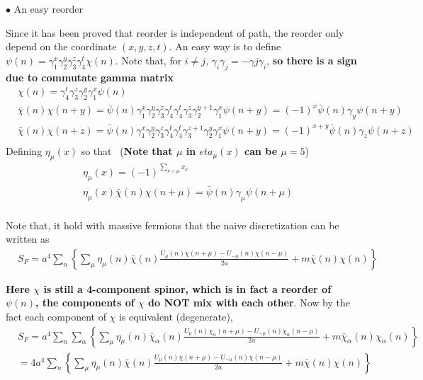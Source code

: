 $\bullet$ An easy reorder

Since it has been proved that reorder is independent of path, the reorder only depend on the coordinate $(x,y,z,t)$. An easy way is to define $\psi (n)=\gamma _1^x\gamma _2^y\gamma _3^z\gamma _4^t \chi (n)$. Note that, for $i\neq j$, $\gamma _i \gamma _j = -\gamma j \gamma _i$, \textbf{so there is a sign due to commutate gamma matrix}
\begin{equation}
\begin{split}
&\chi (n)=\gamma _4^t  \gamma _3^z \gamma _2^y  \gamma _1^x\psi (n)\\
&\bar{\chi}(n) \chi (n+y)= \bar{\psi} (n)\gamma _1^x \gamma _2^y \gamma _3^z \gamma _4^t \gamma _4^t  \gamma _3^z \gamma _2^{y+1}  \gamma _1^x\psi (n + y)=(-1)^x \bar{\psi} (n) \gamma _y \psi (n+y)\\
&\bar{\chi}(n) \chi (n+z)= \bar{\psi} (n)\gamma _1^x \gamma _2^y \gamma _3^z \gamma _4^t \gamma _4^t  \gamma _3^{z+1} \gamma _2^y  \gamma _1^x\psi (n + y)=(-1)^{x+y} \bar{\psi} (n) \gamma _z \psi (n+z)\\
\end{split}
\end{equation}
Defining $\eta_{\mu}(x)$ so that ~(\textbf{Note that $\mu$ in $eta _{\mu}(x)$ can be $\mu=5$})
\begin{equation}
\begin{split}
&\eta _{\mu}(x) = (-1)^{\sum _{\nu < \mu} x_{\nu}}\\
&\eta _{\mu}(x)\bar{\chi}(n) \chi (n+\mu)= \bar{\psi}(n) \gamma _{\mu} \psi (n+\mu)\\
\end{split}
\end{equation}

Note that, it hold with massive fermions that the naive discretization can be written as
\begin{equation}
\begin{split}
&S_F=a^4\sum _n\left\{\sum _{\mu}\eta _{\mu}(n)\bar{\chi}(n) \frac{U_{\mu}(n) \chi (n+\mu) - U_{-\mu}(n)\chi (n-\mu)}{2a} + m \bar{\chi}(n)\chi (n)\right\}
\end{split}
\end{equation}

\textbf{Here $\chi$ is still a 4-component spinor, which is in fact a reorder of $\psi (n)$, the components of $\chi$ do NOT mix with each other}. Now by the fact each component of $\chi$ is equivalent (degenerate),
\begin{equation}
\begin{split}
&S_F=a^4\sum _n\sum _{\alpha}\left\{\sum _{\mu}\eta _{\mu}(n)\bar{\chi}_{\alpha}(n) \frac{U_{\mu}(n) \chi_{\alpha} (n+\mu) - U_{-\mu}(n)\chi _{\alpha}(n-\mu)}{2a} + m \bar{\chi}_{\alpha}(n)\chi_{\alpha} (n)\right\}\\
&=4a^4\sum _n\left\{\sum _{\mu}\eta _{\mu}(n)\bar{\chi}(n) \frac{U_{\mu}(n) \chi (n+\mu) - U_{-\mu}(n)\chi (n-\mu)}{2a} + m \bar{\chi}(n)\chi (n)\right\}\\
\end{split}
\end{equation}

